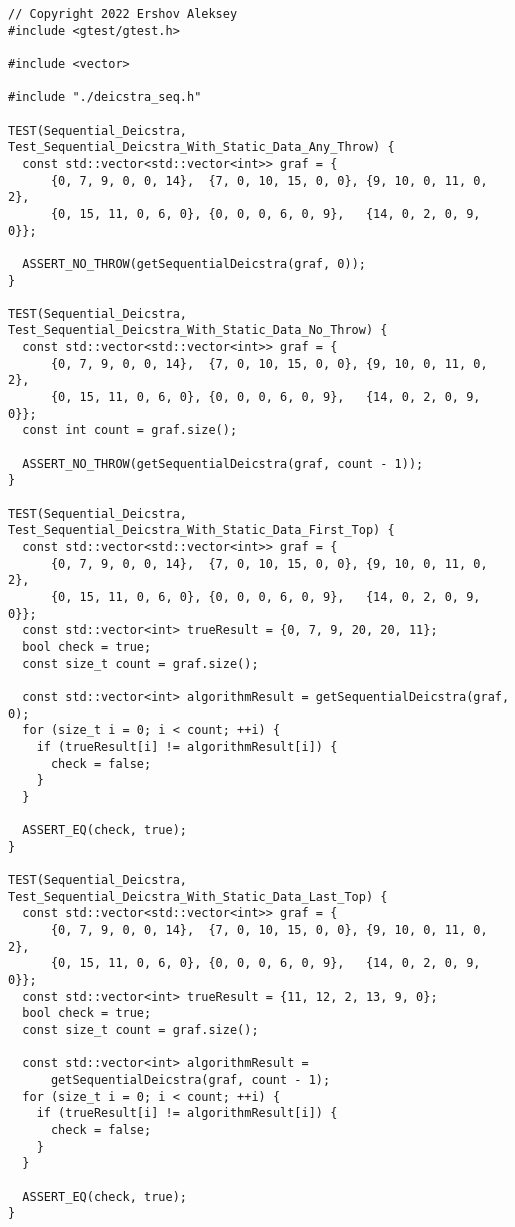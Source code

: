 \documentclass{report}
\begin{document}
\begin{lstlisting}
// Copyright 2022 Ershov Aleksey
#include <gtest/gtest.h>

#include <vector>

#include "./deicstra_seq.h"

TEST(Sequential_Deicstra, Test_Sequential_Deicstra_With_Static_Data_Any_Throw) {
  const std::vector<std::vector<int>> graf = {
      {0, 7, 9, 0, 0, 14},  {7, 0, 10, 15, 0, 0}, {9, 10, 0, 11, 0, 2},
      {0, 15, 11, 0, 6, 0}, {0, 0, 0, 6, 0, 9},   {14, 0, 2, 0, 9, 0}};

  ASSERT_NO_THROW(getSequentialDeicstra(graf, 0));
}

TEST(Sequential_Deicstra, Test_Sequential_Deicstra_With_Static_Data_No_Throw) {
  const std::vector<std::vector<int>> graf = {
      {0, 7, 9, 0, 0, 14},  {7, 0, 10, 15, 0, 0}, {9, 10, 0, 11, 0, 2},
      {0, 15, 11, 0, 6, 0}, {0, 0, 0, 6, 0, 9},   {14, 0, 2, 0, 9, 0}};
  const int count = graf.size();

  ASSERT_NO_THROW(getSequentialDeicstra(graf, count - 1));
}

TEST(Sequential_Deicstra, Test_Sequential_Deicstra_With_Static_Data_First_Top) {
  const std::vector<std::vector<int>> graf = {
      {0, 7, 9, 0, 0, 14},  {7, 0, 10, 15, 0, 0}, {9, 10, 0, 11, 0, 2},
      {0, 15, 11, 0, 6, 0}, {0, 0, 0, 6, 0, 9},   {14, 0, 2, 0, 9, 0}};
  const std::vector<int> trueResult = {0, 7, 9, 20, 20, 11};
  bool check = true;
  const size_t count = graf.size();

  const std::vector<int> algorithmResult = getSequentialDeicstra(graf, 0);
  for (size_t i = 0; i < count; ++i) {
    if (trueResult[i] != algorithmResult[i]) {
      check = false;
    }
  }

  ASSERT_EQ(check, true);
}

TEST(Sequential_Deicstra, Test_Sequential_Deicstra_With_Static_Data_Last_Top) {
  const std::vector<std::vector<int>> graf = {
      {0, 7, 9, 0, 0, 14},  {7, 0, 10, 15, 0, 0}, {9, 10, 0, 11, 0, 2},
      {0, 15, 11, 0, 6, 0}, {0, 0, 0, 6, 0, 9},   {14, 0, 2, 0, 9, 0}};
  const std::vector<int> trueResult = {11, 12, 2, 13, 9, 0};
  bool check = true;
  const size_t count = graf.size();

  const std::vector<int> algorithmResult =
      getSequentialDeicstra(graf, count - 1);
  for (size_t i = 0; i < count; ++i) {
    if (trueResult[i] != algorithmResult[i]) {
      check = false;
    }
  }

  ASSERT_EQ(check, true);
}


\end{lstlisting}
\end{document}
